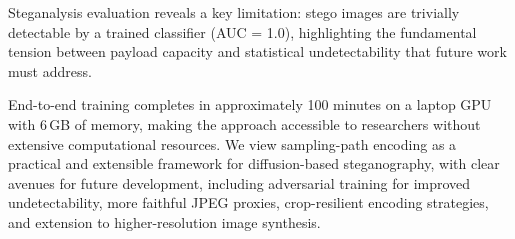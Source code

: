 \documentclass[conference]{IEEEtran}
\begin{document}
Steganalysis evaluation reveals a key limitation: stego images are trivially detectable by a trained classifier (AUC = 1.0), highlighting the fundamental tension between payload capacity and statistical undetectability that future work must address.

End-to-end training completes in approximately 100 minutes on a laptop GPU with 6\,GB of memory, making the approach accessible to researchers without extensive computational resources.
We view sampling-path encoding as a practical and extensible framework for diffusion-based steganography, with clear avenues for future development, including adversarial training for improved undetectability, more faithful JPEG proxies, crop-resilient encoding strategies, and extension to higher-resolution image synthesis.



\end{document}
